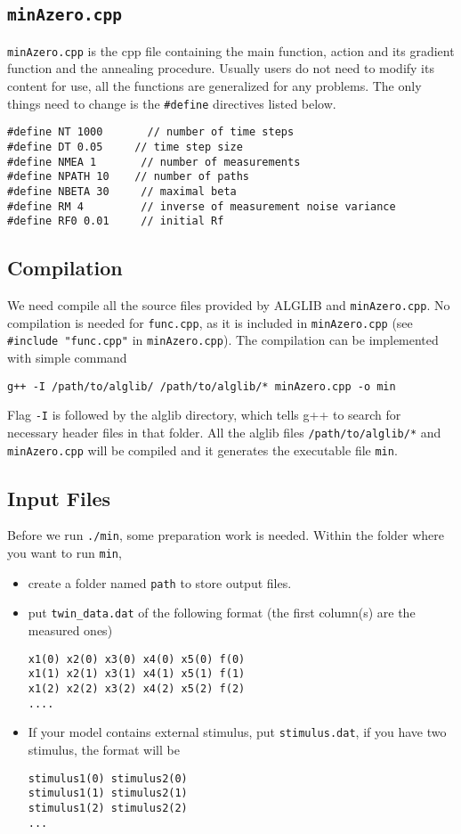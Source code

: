 \documentclass[11pt]{article}
\begin{document}
\subsection{\texttt{minAzero.cpp}}
\texttt{minAzero.cpp} is the cpp file containing the main function, action and its gradient function and the annealing procedure.  Usually users do not need to modify its content for use, all the functions are generalized for any problems. The only things need to change is the \texttt{\#define} directives listed below.
\begin{verbatim} 
#define NT 1000       // number of time steps
#define DT 0.05     // time step size
#define NMEA 1       // number of measurements
#define NPATH 10    // number of paths
#define NBETA 30     // maximal beta
#define RM 4         // inverse of measurement noise variance
#define RF0 0.01     // initial Rf
\end{verbatim}
\subsection{Compilation}
We need compile all the source files provided by ALGLIB and \texttt{minAzero.cpp}.  No compilation is needed for \texttt{func.cpp}, as it is included in \texttt{minAzero.cpp} (see \texttt{\#include "func.cpp"} in \texttt{minAzero.cpp}). The compilation can be implemented with simple command 
\begin{verbatim}
g++ -I /path/to/alglib/ /path/to/alglib/* minAzero.cpp -o min
\end{verbatim}
Flag \texttt{-I} is followed by the alglib directory, which tells g++ to search for necessary header files in that folder. All the alglib files \texttt{/path/to/alglib/*} and \texttt{minAzero.cpp} will be compiled and it generates the executable file \texttt{min}.
\subsection{Input Files}
Before we run \texttt{./min}, some preparation work is needed. Within the folder where you want to run \texttt{min}, 
\begin{itemize}
\item create a folder named \texttt{path}  to store output files.
\item put \texttt{twin\_data.dat} of the following format (the first  column(s) are the measured ones)
\begin{verbatim}
x1(0) x2(0) x3(0) x4(0) x5(0) f(0)
x1(1) x2(1) x3(1) x4(1) x5(1) f(1)
x1(2) x2(2) x3(2) x4(2) x5(2) f(2)
....
\end{verbatim}
\item If your model contains external stimulus, put \texttt{stimulus.dat}, if you have two stimulus, the format will be
\begin{verbatim}
stimulus1(0) stimulus2(0) 
stimulus1(1) stimulus2(1) 
stimulus1(2) stimulus2(2)
...
\end{verbatim}
\end{itemize}
\end{document}
